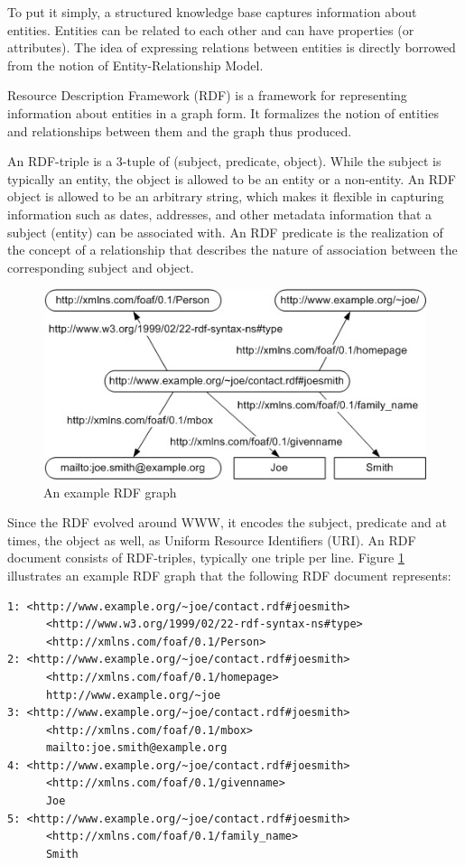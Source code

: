 \documentclass[a4paper, twoside, 12pt]{report}
\begin{document}
To put it simply, a structured knowledge base captures information about entities. Entities can be related to each other and can have properties (or attributes). The idea of expressing relations between entities is directly borrowed from the notion of Entity-Relationship Model.

Resource Description Framework (RDF) is a framework for representing information about entities in a graph form. It formalizes the notion of entities and relationships between them and the graph thus produced.

An RDF-triple is a 3-tuple of (subject, predicate, object). While the subject is typically an entity, the object is allowed to be an entity or a non-entity. An RDF object is allowed to be an arbitrary string, which makes it flexible in capturing information such as dates, addresses, and other metadata information that a subject (entity) can be associated with. An RDF predicate is the realization of the concept of a relationship that describes the nature of association between the corresponding subject and object.

\begin{figure}[h!]
  \includegraphics[scale=0.8]{joe-smith-rdf.jpg}
  \caption{An example RDF graph}
  \label{fig:rdfexample}
\end{figure}


Since the RDF evolved around WWW, it encodes the subject, predicate and at times, the object as well, as Uniform Resource Identifiers (URI). An RDF document consists of RDF-triples, typically one triple per line. Figure \ref{fig:rdfexample} illustrates an example RDF graph that the following RDF document represents:

\begin{verbatim}
1: <http://www.example.org/~joe/contact.rdf#joesmith>
      <http://www.w3.org/1999/02/22-rdf-syntax-ns#type>
      <http://xmlns.com/foaf/0.1/Person>
2: <http://www.example.org/~joe/contact.rdf#joesmith>
      <http://xmlns.com/foaf/0.1/homepage>
      http://www.example.org/~joe
3: <http://www.example.org/~joe/contact.rdf#joesmith>
      <http://xmlns.com/foaf/0.1/mbox>
      mailto:joe.smith@example.org
4: <http://www.example.org/~joe/contact.rdf#joesmith>
      <http://xmlns.com/foaf/0.1/givenname>
      Joe
5: <http://www.example.org/~joe/contact.rdf#joesmith>
      <http://xmlns.com/foaf/0.1/family_name>
      Smith
\end{verbatim}
\end{document}
